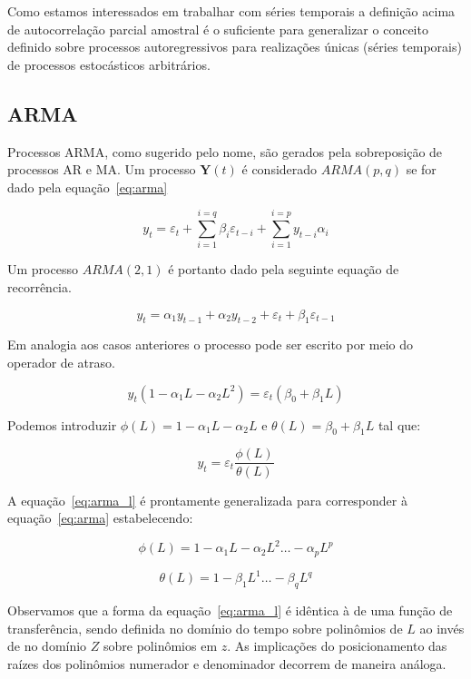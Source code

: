 Como estamos interessados em trabalhar com séries temporais a definição acima
de autocorrelação parcial amostral é o suficiente para generalizar o conceito
definido sobre processos autoregressivos para realizações únicas (séries
temporais) de processos estocásticos arbitrários.

\subsection{ARMA}
\label{ssec:ARMA}

Processos ARMA, como sugerido pelo nome, são gerados pela sobreposição de
processos AR e MA. Um processo ${\mathbf{Y}}(t)$ é considerado $ARMA(p, q)$ se
for dado pela equação~\ref{eq:arma}

\begin{equation}\label{eq:arma}
    y_t = \varepsilon_t + \sum_{i=1}^{i=q} \beta_i \varepsilon_{t-i} + \sum_{i=1}^{i=p} y_{t-i}\alpha_i
\end{equation}

Um processo $ARMA(2, 1)$ é portanto dado pela seguinte equação de recorrência.

$$ y_t = \alpha_1 y_{t-1} + \alpha_2 y_{t-2} + \varepsilon_{t} + \beta_1 \varepsilon_{t-1} $$

Em analogia aos casos anteriores o processo pode ser escrito por meio do
operador de atraso.

$$ y_t (1 - \alpha_1 L - \alpha_2 L^2) = \varepsilon_{t} (\beta_0 + \beta_1 L) $$

Podemos introduzir $\phi(L) = 1 - \alpha_1 L - \alpha_2 L$ e $\theta(L) =
\beta_0 + \beta_1 L$ tal que:

\begin{equation}\label{eq:arma_l}
    y_t = \varepsilon_t \frac{\phi(L)}{\theta(L)}
\end{equation}

A equação~\ref{eq:arma_l} é prontamente generalizada para corresponder à
equação~\ref{eq:arma} estabelecendo:

$$\phi(L) = 1 - \alpha_1 L - \alpha_2 L^2 \hdots - \alpha_p L^p$$

$$\theta(L) = 1 - \beta_1 L^1 \hdots - \beta_q L^q$$


Observamos que a forma da equação~\ref{eq:arma_l} é idêntica à de uma função de
transferência, sendo definida no domínio do tempo sobre polinômios de $L$ ao
invés de no domínio $Z$ sobre polinômios em $z$. As implicações do
posicionamento das raízes dos polinômios numerador e denominador decorrem de
maneira análoga.

